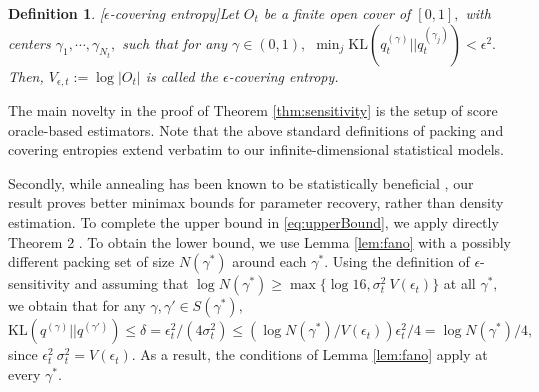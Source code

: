 \documentclass[11pt]{article}
\theoremstyle{plain}
\newtheorem{definition}[theorem]{Definition}
\newcommand{\1}{\mathbbm{1}}
\newcommand{\qdist}[2][]{q_{#1}^{(#2)}}
\begin{document}
\begin{appendices}
\begin{definition}{[$\epsilon$-covering entropy]}\label{def:cover-entropy}
Let $O_t$ be a finite open cover of $[0,1],$ with centers $\gamma_1, \cdots, \gamma_{N_t},$ such that for any $\gamma \in (0,1),$ $\min_j \mathrm{KL}(\qdist[t]{\gamma}||\qdist[t]{\gamma_j}) < \epsilon^2.$ Then, $V_{\epsilon,t} := \log |O_t|$ is called the $\epsilon$-covering entropy. 
    
\end{definition}

The main novelty in the proof of Theorem \ref{thm:sensitivity} is the setup of score oracle-based estimators. Note that the above standard definitions of packing and covering entropies extend verbatim to our infinite-dimensional statistical models.


Secondly, while annealing has been known to be statistically beneficial \citep{koehler2022statisticalefficiencyscorematching, qin2024fit}, our result proves better minimax bounds for parameter recovery, rather than density estimation. 
To complete the upper bound in \eqref{eq:upperBound}, we apply directly Theorem 2 \citep{yangBarron}. To obtain the lower bound, we use Lemma \ref{lem:fano} with a possibly different packing set of size $N(\gamma^*)$ around each $\gamma^*.$ Using the definition of $\epsilon$-sensitivity and assuming that $\log N(\gamma^*) \geq \max\{\log 16, \sigma_t^2\: V(\epsilon_{t}) \}$ at all $\gamma^*,$ we obtain that for any $\gamma, \gamma' \in S(\gamma^*),$ $\mathrm{KL}(\qdist{\gamma}||\qdist{\gamma'}) \leq \delta = \epsilon_{t}^2/(4 \sigma_t^2) \leq (\log N(\gamma^*)/V(\epsilon_{t}))  \epsilon_{t}^2/4 = \log N(\gamma^*)/4,$ since $\epsilon_{t}^2 \: \sigma_t^2 = V(\epsilon_{t}).$ As a result, the conditions of Lemma \ref{lem:fano} apply at every $\gamma^*.$

\end{appendices}
\end{document}

